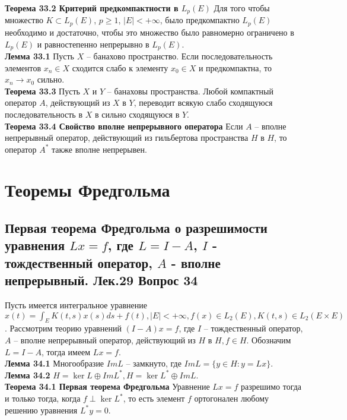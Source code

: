 \documentclass{article}
\begin{document}
	\textbf{Теорема 33.2 Критерий предкомпактности в ${L}_{p}(E)$} Для того чтобы множество $K\subset {L}_{p}(E)$, $p\ge 1$, $|E|<+\infty$, было предкомпактно ${L}_{p}(E)$ необходимо и достаточно, чтобы это множество было равномерно ограничено в ${L}_{p}(E)$ и равностепенно непрерывно в ${L}_{p}(E)$.\\
	\textbf{Лемма 33.1} Пусть $X$ – банахово пространство. Если последовательность элементов ${x}_{n}\in X$ сходится слабо к элементу ${x}_{0}\in X$ и предкомпактна, то ${x}_{n}\rightarrow {x}_{0}$ сильно.\\
	\textbf{Теорема 33.3} Пусть $X$ и $Y$ – банаховы пространства. Любой компактный оператор $A$, действующий из $X$ в $Y$, переводит всякую слабо сходящуюся последовательность в $X$ в сильно сходящуюся в $Y$.\\
	\textbf{Теорема 33.4 Свойство вполне непрерывного оператора} Если $A$ – вполне непрерывный оператор, действующий из гильбертова пространства $H$ в $H$, то оператор ${A}^{*}$ также вполне непрерывен.
\section{Теоремы Фредгольма}
\subsection{Первая теорема Фредгольма о разрешимости уравнения $Lx=f$, где $L=I-A$, $I$ - тождественный оператор, $A$ - вполне непрерывный. Лек.29 \textbf{Вопрос 34}}
	Пусть имеется интегральное уравнение $x(t)=\int_{E}K(t,s)x(s)ds+f(t),|E|<+\infty,f(x)\in {L}_{2}(E),K(t,s)\in {L}_{2}(E\times E)$. Рассмотрим теорию уравнений $(I-A)x=f$, где $I$ – тождественный оператор, $A$ – вполне непрерывный оператор, действующий из $H$ в $H,f\in H$. Обозначим $L=I-A$, тогда имеем $Lx=f$.\\
	\textbf{Лемма 34.1} Многообразие $ImL$ – замкнуто, где $ImL=\{y\in H:y=Lx\}$.\\
	\textbf{Лемма 34.2} $H=\ker L\oplus Im{L}^{*},H=\ker {L}^{*}\oplus ImL$.\\
	\textbf{Теорема 34.1 Первая теорема Фредгольма} Уравнение $Lx=f$ разрешимо тогда и только тогда, когда $f\perp \ker {L}^{*}$, то есть элемент $f$ ортогонален любому решению уравнения ${L}^{*}y=0$.\\
\end{document}

